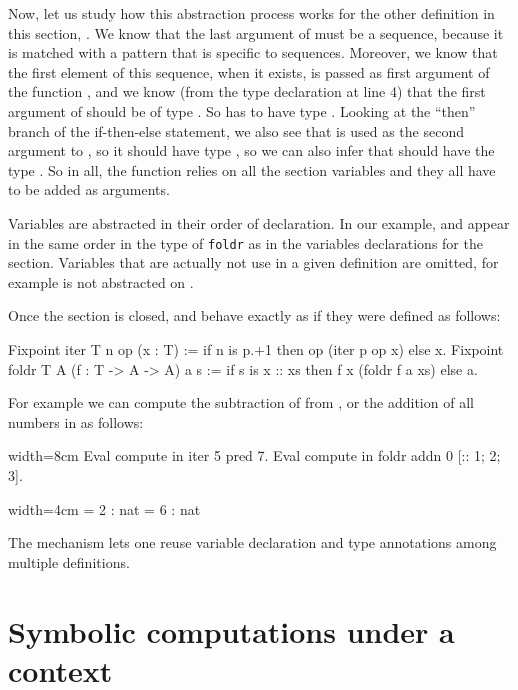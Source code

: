 Now, let us study how this abstraction process works for the other definition
in this section, .  We know that the last argument  of 
must be a sequence, because it is matched with a pattern that is specific
to sequences.  Moreover, we know that the first element of this sequence,
when it exists, is passed as first argument of the function , and
we know (from the type declaration at line 4) that the first argument of
 should be of type .  So  has to have type .
Looking at the ``then'' branch of the if-then-else statement, we also see
that  is used as the second argument to , so it should
have type , so we can also infer that  should have the type .
So in all, the function  relies on all the section variables and
they all have to be added as arguments.

Variables are abstracted in their order of declaration.  In our example,
 and  appear in the same order in the type of {\tt foldr} as
in the variables declarations for the section.  Variables that are actually
not use in a given definition are omitted, for example 
is not abstracted on .

Once the section is closed,  and  behave exactly as
if they were defined as follows:

\begin{coq}{}{}
Fixpoint iter T n op (x : T) :=
  if n is p.+1 then op (iter p op x) else x.
Fixpoint foldr T A (f : T -> A -> A) a s :=
  if s is x :: xs then f x (foldr f a xs) else a.
\end{coq}
For example we can compute the subtraction of  from , or the 
addition of all numbers in \C{[:: 1; 2; 3]}
as follows:

\begin{coq}{}{width=8cm}
Eval compute in iter 5 pred 7.
Eval compute in foldr addn 0 [:: 1; 2; 3].
\end{coq}
\begin{coqout}{}{width=4cm}
 = 2 : nat
 = 6 : nat
\end{coqout}

The  mechanism lets one reuse variable declaration and type
annotations among multiple definitions.

\section{Symbolic computations under a context}

